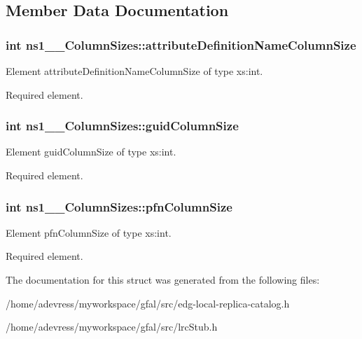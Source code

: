 \subsection{Member Data Documentation}
\subsubsection{\setlength{\rightskip}{0pt plus 5cm}int \bf{ns1\_\-\_\-Column\-Sizes::attribute\-Definition\-Name\-Column\-Size}}\label{structns1____ColumnSizes_ea49ae840f5f108da7482bd88feb5060}


Element attribute\-Definition\-Name\-Column\-Size of type xs:int. 

Required element. 
\subsubsection{\setlength{\rightskip}{0pt plus 5cm}int \bf{ns1\_\-\_\-Column\-Sizes::guid\-Column\-Size}}\label{structns1____ColumnSizes_1692faf7863a09c5d65f13bfda519458}


Element guid\-Column\-Size of type xs:int. 

Required element. 
\subsubsection{\setlength{\rightskip}{0pt plus 5cm}int \bf{ns1\_\-\_\-Column\-Sizes::pfn\-Column\-Size}}\label{structns1____ColumnSizes_797c550db1349e5ff573a51ca7ccf1b5}


Element pfn\-Column\-Size of type xs:int. 

Required element. 

The documentation for this struct was generated from the following files:\begin{CompactItemize}
\item 
/home/adevress/myworkspace/gfal/src/edg-local-replica-catalog.h\item 
/home/adevress/myworkspace/gfal/src/lrc\-Stub.h\end{CompactItemize}
